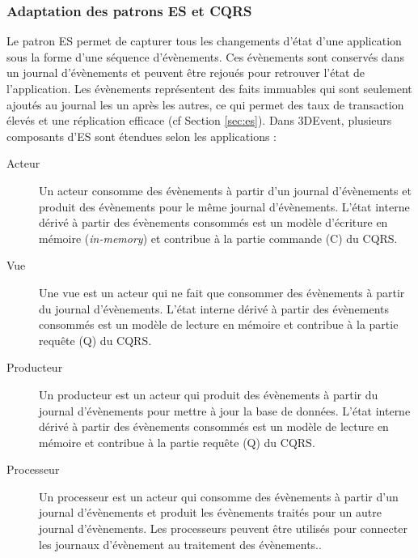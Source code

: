 \subsubsection{Adaptation des patrons \gls{ES} et \gls{CQRS}}
Le patron \gls{ES} permet de capturer tous les changements d'état 
d'une application sous la forme d'une séquence d'évènements. 
Ces évènements sont conservés dans un journal d'évènements et peuvent être 
rejoués pour retrouver l'état de l'application. 
Les évènements représentent des faits immuables qui sont 
seulement ajoutés au journal les un après les autres, ce qui permet des taux de 
transaction élevés et une réplication efficace (cf Section 
\ref{sec:es}). Dans 3DEvent, plusieurs composants d'\gls{ES} sont étendues selon 
les applications :

\begin{description}
	\item[Acteur] Un acteur consomme des évènements à partir d'un journal 
	d'évènements et produit des évènements pour le même journal d'évènements. 
	L'état interne dérivé à partir des évènements consommés est un modèle 
	d'écriture 
	en mémoire (\textit{in-memory}) et contribue à la partie commande (C) du 
	CQRS.
	\item[Vue] Une vue est un acteur qui ne fait que consommer des évènements à 
	partir du journal d'évènements. L'état interne dérivé à partir des évènements 
	consommés est un modèle de lecture en mémoire et contribue à la partie 
	requête (Q) du CQRS.
	\item[Producteur] Un producteur est un acteur qui produit des évènements à 
	partir 
	du journal d'évènements pour mettre à jour la base de données. L'état interne 
	dérivé 
	à partir des évènements consommés est un modèle de lecture en mémoire et 
	contribue à la partie requête (Q) du CQRS.
	\item[Processeur] Un processeur est un acteur qui consomme des évènements 
	à 
	partir d'un journal d'évènements et produit les évènements traités pour un autre 
	journal d'évènements. Les processeurs peuvent être utilisés pour connecter les 
	journaux d'évènement au traitement des évènements..
	
\end{description}


